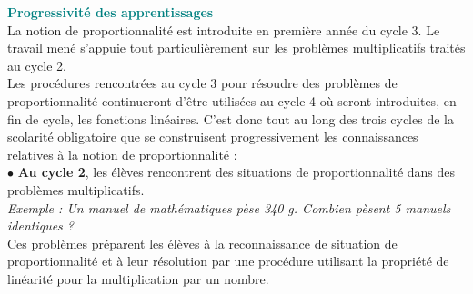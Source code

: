 \begin{center}
   \begin{minipage}{15cm}
      \begin{flushleft}
         \textsf{\textcolor{teal}{\bf Progressivité des apprentissages} \\
         La notion de proportionnalité est introduite en première année du cycle 3. Le travail mené s’appuie tout particulièrement sur les problèmes multiplicatifs traités au cycle 2. \\
         Les procédures rencontrées au cycle 3 pour résoudre des problèmes de proportionnalité continueront d’être utilisées au cycle 4 où seront introduites, en fin de cycle, les fonctions linéaires. C’est donc tout au long des trois cycles de la scolarité obligatoire que se construisent progressivement les connaissances relatives à la notion de proportionnalité : \\
         $\bullet$ {\bf Au cycle 2}, les élèves rencontrent des situations de proportionnalité dans des problèmes multiplicatifs. \\
         {\it Exemple : Un manuel de mathématiques pèse 340 g. Combien pèsent 5 manuels identiques ?} \\
         Ces problèmes préparent les élèves à la reconnaissance de situation de proportionnalité et à leur résolution par une procédure utilisant la propriété de linéarité pour la multiplication par un nombre.}
      \end{flushleft}
   \end{minipage}
\end{center}

